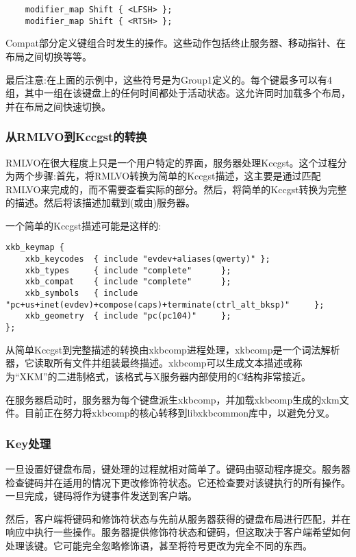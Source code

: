 \begin{lstlisting}
	modifier_map Shift { <LFSH> };
	modifier_map Shift { <RTSH> };
\end{lstlisting}

Compat部分定义键组合时发生的操作。这些动作包括终止服务器、移动指针、在布局之间切换等等。

最后注意:在上面的示例中，这些符号是为Group1定义的。每个键最多可以有4组，其中一组在该键盘上的任何时间都处于活动状态。这允许同时加载多个布局，并在布局之间快速切换。

\subsubsection{从RMLVO到Kccgst的转换}

RMLVO在很大程度上只是一个用户特定的界面，服务器处理Kccgst。这个过程分为两个步骤:首先，将RMLVO转换为简单的Kccgst描述，这主要是通过匹配RMLVO来完成的，而不需要查看实际的部分。然后，将简单的Kccgst转换为完整的描述。然后将该描述加载到(或由)服务器。

\noindent 一个简单的Kccgst描述可能是这样的:

\begin{lstlisting}
xkb_keymap {
	xkb_keycodes  { include "evdev+aliases(qwerty)" };
	xkb_types     { include "complete"      };
	xkb_compat    { include "complete"      };
	xkb_symbols   { include "pc+us+inet(evdev)+compose(caps)+terminate(ctrl_alt_bksp)"     };
	xkb_geometry  { include "pc(pc104)"     };
};
\end{lstlisting}

从简单Kccgst到完整描述的转换由xkbcomp进程处理，xkbcomp是一个词法解析器，它读取所有文件并组装最终描述。xkbcomp可以生成文本描述或称为“XKM”的二进制格式，该格式与X服务器内部使用的C结构非常接近。

在服务器启动时，服务器为每个键盘派生xkbcomp，并加载xkbcomp生成的xkm文件。目前正在努力将xkbcomp的核心转移到libxkbcommon库中，以避免分叉。

\subsubsection{Key处理}

一旦设置好键盘布局，键处理的过程就相对简单了。键码由驱动程序提交。服务器检查键码并在适用的情况下更改修饰符状态。它还检查要对该键执行的所有操作。一旦完成，键码将作为键事件发送到客户端。

然后，客户端将键码和修饰符状态与先前从服务器获得的键盘布局进行匹配，并在响应中执行一些操作。服务器提供修饰符状态和键码，但这取决于客户端希望如何处理该键。它可能完全忽略修饰语，甚至将符号更改为完全不同的东西。

